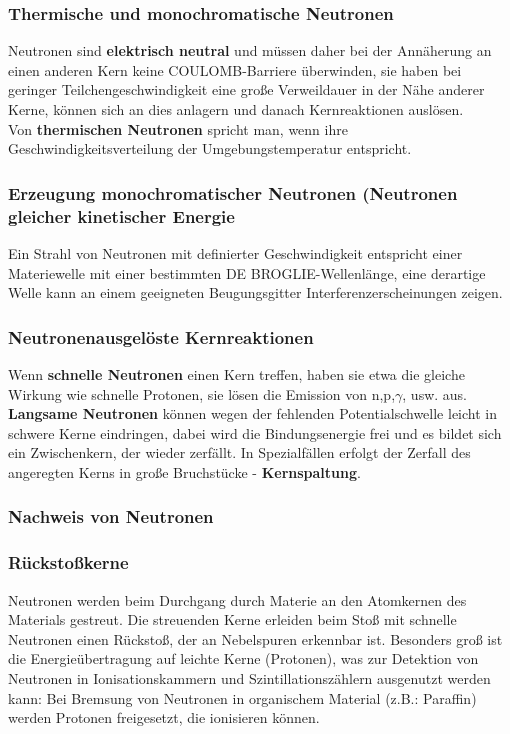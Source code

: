 \documentclass[12pt,a4paper,ngerman]{article}
\begin{document}
\subsubsection*{Thermische und monochromatische Neutronen}
Neutronen sind \textbf{elektrisch neutral} und müssen daher bei der Annäherung an einen anderen Kern keine COULOMB-Barriere überwinden, sie haben bei geringer Teilchengeschwindigkeit eine große Verweildauer in der Nähe anderer Kerne, können sich an dies anlagern und danach Kernreaktionen auslösen. \\
Von \textbf{thermischen Neutronen} spricht man, wenn ihre Geschwindigkeitsverteilung der Umgebungstemperatur entspricht. 
\subsubsection*{Erzeugung monochromatischer Neutronen (Neutronen gleicher kinetischer Energie}
Ein Strahl von Neutronen mit definierter Geschwindigkeit entspricht einer Materiewelle mit einer bestimmten DE BROGLIE-Wellenlänge, eine derartige Welle kann an einem geeigneten Beugungsgitter Interferenzerscheinungen zeigen. 

\subsubsection*{Neutronenausgelöste Kernreaktionen}
Wenn \textbf{schnelle Neutronen} einen Kern treffen, haben sie etwa die gleiche Wirkung wie schnelle Protonen, sie lösen die Emission von n,p,$\gamma$, usw. aus. \\
\textbf{Langsame Neutronen} können wegen der fehlenden Potentialschwelle leicht in schwere Kerne eindringen, dabei wird die Bindungsenergie frei und es bildet sich ein Zwischenkern, der wieder zerfällt. In Spezialfällen erfolgt der Zerfall des angeregten Kerns in große Bruchstücke - \textbf{Kernspaltung}.  

\subsubsection*{Nachweis von Neutronen}
\subsubsection*{Rückstoßkerne} Neutronen werden beim Durchgang durch Materie an den Atomkernen des Materials gestreut. Die streuenden Kerne erleiden beim Stoß mit schnelle Neutronen einen Rückstoß, der an Nebelspuren erkennbar ist. Besonders groß ist die Energieübertragung auf leichte Kerne (Protonen), was zur Detektion von Neutronen in Ionisationskammern und Szintillationszählern ausgenutzt werden kann: Bei Bremsung von Neutronen in organischem Material (z.B.: Paraffin) werden Protonen freigesetzt, die ionisieren können. 
\end{document}
